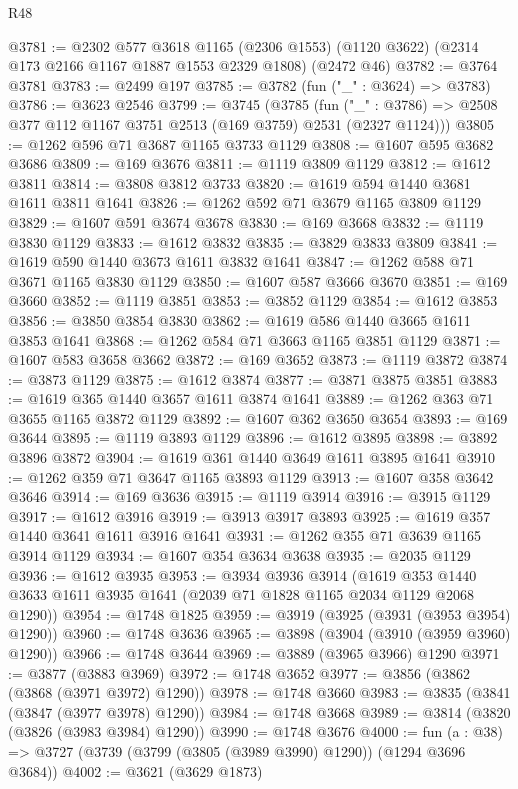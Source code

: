 \begin{lexlean}{R48}
\begin{coremodule}
@3781 := @2302
    @577
    @3618
    @1165
    (@2306 @1553)
    (@1120 @3622)
    (@2314 @173 @2166 @1167 @1887 @1553 @2329 @1808)
    (@2472 @46)
@3782 := @3764 @3781
@3783 := @2499 @197
@3785 := @3782 (fun ("_" : @3624) => @3783)
@3786 := @3623 @2546
@3799 := @3745
    (@3785
      (fun ("_" : @3786) => @2508 @377 @112 @1167 @3751 @2513 (@169 @3759) @2531 (@2327 @1124)))
@3805 := @1262 @596 @71 @3687 @1165 @3733 @1129
@3808 := @1607 @595 @3682 @3686
@3809 := @169 @3676
@3811 := @1119 @3809 @1129
@3812 := @1612 @3811
@3814 := @3808 @3812 @3733
@3820 := @1619 @594 @1440 @3681 @1611 @3811 @1641
@3826 := @1262 @592 @71 @3679 @1165 @3809 @1129
@3829 := @1607 @591 @3674 @3678
@3830 := @169 @3668
@3832 := @1119 @3830 @1129
@3833 := @1612 @3832
@3835 := @3829 @3833 @3809
@3841 := @1619 @590 @1440 @3673 @1611 @3832 @1641
@3847 := @1262 @588 @71 @3671 @1165 @3830 @1129
@3850 := @1607 @587 @3666 @3670
@3851 := @169 @3660
@3852 := @1119 @3851
@3853 := @3852 @1129
@3854 := @1612 @3853
@3856 := @3850 @3854 @3830
@3862 := @1619 @586 @1440 @3665 @1611 @3853 @1641
@3868 := @1262 @584 @71 @3663 @1165 @3851 @1129
@3871 := @1607 @583 @3658 @3662
@3872 := @169 @3652
@3873 := @1119 @3872
@3874 := @3873 @1129
@3875 := @1612 @3874
@3877 := @3871 @3875 @3851
@3883 := @1619 @365 @1440 @3657 @1611 @3874 @1641
@3889 := @1262 @363 @71 @3655 @1165 @3872 @1129
@3892 := @1607 @362 @3650 @3654
@3893 := @169 @3644
@3895 := @1119 @3893 @1129
@3896 := @1612 @3895
@3898 := @3892 @3896 @3872
@3904 := @1619 @361 @1440 @3649 @1611 @3895 @1641
@3910 := @1262 @359 @71 @3647 @1165 @3893 @1129
@3913 := @1607 @358 @3642 @3646
@3914 := @169 @3636
@3915 := @1119 @3914
@3916 := @3915 @1129
@3917 := @1612 @3916
@3919 := @3913 @3917 @3893
@3925 := @1619 @357 @1440 @3641 @1611 @3916 @1641
@3931 := @1262 @355 @71 @3639 @1165 @3914 @1129
@3934 := @1607 @354 @3634 @3638
@3935 := @2035 @1129
@3936 := @1612 @3935
@3953 := @3934
    @3936
    @3914
    (@1619 @353 @1440 @3633 @1611 @3935 @1641 (@2039 @71 @1828 @1165 @2034 @1129 @2068 @1290))
@3954 := @1748 @1825
@3959 := @3919 (@3925 (@3931 (@3953 @3954) @1290))
@3960 := @1748 @3636
@3965 := @3898 (@3904 (@3910 (@3959 @3960) @1290))
@3966 := @1748 @3644
@3969 := @3889 (@3965 @3966) @1290
@3971 := @3877 (@3883 @3969)
@3972 := @1748 @3652
@3977 := @3856 (@3862 (@3868 (@3971 @3972) @1290))
@3978 := @1748 @3660
@3983 := @3835 (@3841 (@3847 (@3977 @3978) @1290))
@3984 := @1748 @3668
@3989 := @3814 (@3820 (@3826 (@3983 @3984) @1290))
@3990 := @1748 @3676
@4000 := fun (a : @38) => @3727 (@3739 (@3799 (@3805 (@3989 @3990) @1290)) (@1294 @3696 @3684))
@4002 := @3621 (@3629 @1873)

\end{coremodule}
\end{lexlean}
